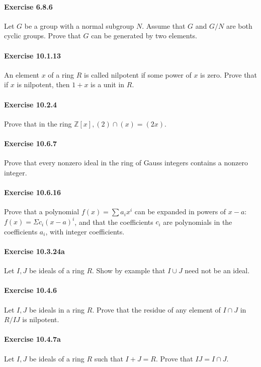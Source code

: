 \documentclass{article}
\begin{document}
\paragraph{Exercise 6.8.6} Let $G$ be a group with a normal subgroup $N$. Assume that $G$ and $G / N$ are both cyclic groups. Prove that $G$ can be generated by two elements.

\paragraph{Exercise 10.1.13} An element $x$ of a ring $R$ is called nilpotent if some power of $x$ is zero. Prove that if $x$ is nilpotent, then $1+x$ is a unit in $R$.

\paragraph{Exercise 10.2.4} Prove that in the ring $\mathbb{Z}[x],(2) \cap(x)=(2 x)$.

\paragraph{Exercise 10.6.7} Prove that every nonzero ideal in the ring of Gauss integers contains a nonzero integer.

\paragraph{Exercise 10.6.16} Prove that a polynomial $f(x)=\sum a_i x^i$ can be expanded in powers of $x-a$: $f(x)=\Sigma c_i(x-a)^i$, and that the coefficients $c_i$ are polynomials in the coefficients $a_i$, with integer coefficients.

\paragraph{Exercise 10.3.24a} Let $I, J$ be ideals of a ring $R$. Show by example that $I \cup J$ need not be an ideal.

\paragraph{Exercise 10.4.6} Let $I, J$ be ideals in a ring $R$. Prove that the residue of any element of $I \cap J$ in $R / I J$ is nilpotent.

\paragraph{Exercise 10.4.7a} Let $I, J$ be ideals of a ring $R$ such that $I+J=R$. Prove that $I J=I \cap J$.
\end{document}
